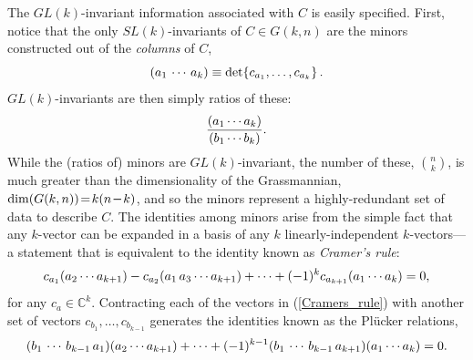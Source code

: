 \documentclass[12pt,hyperref,compress]{JHEP3}
\newcommand{\eq}[1]{\begin{equation}#1\end{equation}}
\newcommand{\mi}{{\rm\rule[2.4pt]{6pt}{0.65pt}}}
\begin{document}
The $GL(k)$-invariant information associated with $C$ is easily specified. First, notice that the only $SL(k)$-invariants of $C\!\in\! G(k,n)$ are the minors constructed out of the {\it columns} of $C$,
\vspace{-.2cm}\eq{(a_1\,\cdots\,a_k)\equiv\mathrm{det}\{c_{a_1},\ldots,c_{a_k}\}\,.\vspace{-.2cm}}
$GL(k)$-invariants are then simply ratios of these:
\vspace{-.2cm}\eq{\frac{(a_1 \cdots a_k)}{(b_1 \cdots b_k)}.\vspace{-.2cm}}
While the (ratios of) minors are $GL(k)$-invariant, the number of these, $n \choose k$, is much greater than the dimensionality of the Grassmannian, $\dim(G(k,n))\!=\!k(n\,\mi\,k)$, and so the minors represent a highly-redundant set of data to describe $C$. The identities among minors arise from the simple fact that any $k$-vector can be expanded in a basis of any $k$ linearly-independent $k$-vectors---a statement that is equivalent to the identity known as {\it Cramer's rule}:
\vspace{-.2cm}\eq{c_{a_1}(a_2\cdots a_{k+1})-c_{a_2}(a_1\,a_3\cdots a_{k+1})+\cdots+(-1)^{k}c_{a_{k+1}}(a_1\cdots a_k)=0,\vspace{-.2cm}\label{Cramers_rule}}
for any $c_a\!\in\!\mathbb{C}^k$. Contracting each of the vectors in (\ref{Cramers_rule}) with another set of vectors $c_{b_1},\ldots,c_{b_{k-1}}$ generates the identities known as the Pl\"{u}cker relations,
\vspace{-.2cm}\eq{(b_1\,\cdots\,b_{k-1}\,a_1)(a_2\cdots a_{k+1})+\cdots+(-1)^{k-1}(b_1\,\cdots\,b_{k-1}\,a_{k+1})(a_1\cdots a_k)=0.\vspace{-.2cm}\label{Plucker_relations}}
\end{document}
